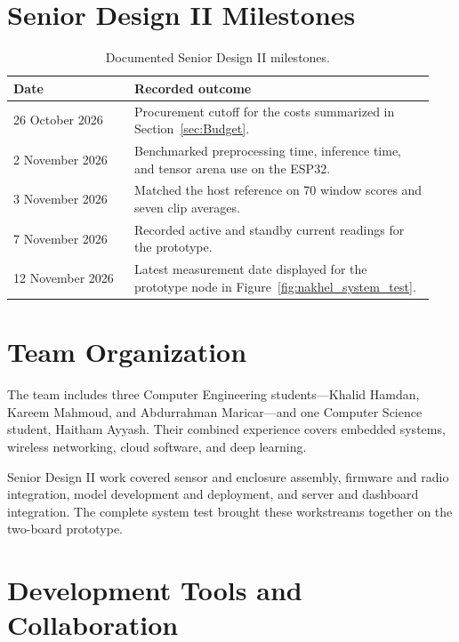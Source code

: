 \documentclass[12pt,a4paper,oneside]{memoir}
\newcommand{\earlierrevision}[1]{#1}
\newcommand{\newrevision}[1]{#1}
\begin{document}
\section{\newrevision{Senior Design II Milestones}}
\label{sec:Schedule}

\begin{table}[htbp]
\centering
\caption{\newrevision{Documented Senior Design II milestones.}}
\begingroup
\color{black}
\begin{tabular}{@{}p{0.27\linewidth}p{0.67\linewidth}@{}}
\toprule
Date & Recorded outcome \\
\midrule
26 October 2026 & Procurement cutoff for the costs summarized in Section~\ref{sec:Budget}. \\
2 November 2026 & Benchmarked preprocessing time, inference time, and tensor arena use on the ESP32. \\
3 November 2026 & Matched the host reference on 70 window scores and seven clip averages. \\
7 November 2026 & Recorded active and standby current readings for the prototype. \\
12 November 2026 & Latest measurement date displayed for the prototype node in Figure~\ref{fig:nakhel_system_test}. \\
\bottomrule
\end{tabular}
\endgroup
\end{table}
\FloatBarrier

\section{Team Organization}
\label{sec:TeamOrg}

\earlierrevision{The team includes three Computer Engineering students---Khalid Hamdan, Kareem Mahmoud, and Abdurrahman Maricar---and one Computer Science student, Haitham Ayyash. Their combined experience covers embedded systems, wireless networking, cloud software, and deep learning.}

\newrevision{Senior Design II work covered sensor and enclosure assembly, firmware and radio integration, model development and deployment, and server and dashboard integration. The complete system test brought these workstreams together on the two-board prototype.}



\section{\newrevision{Development Tools and Collaboration}}
\label{ch:engineering_env}
\end{document}
